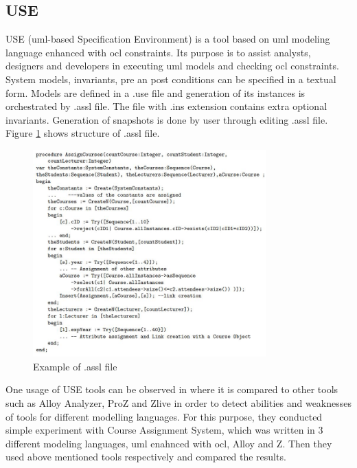 \subsection{USE}
\par
USE (\acrshort{uml}-based Specification Environment) \cite{USE_definition} is a tool based on \acrshort{uml} modeling language enhanced with \acrshort{ocl} constraints. Its purpose is to assist analysts, designers and developers in executing \acrshort{uml} models and checking \acrshort{ocl} constraints. System models, invariants,  pre an post conditions can be specified in a textual form. Models are defined in a .use file and generation of its instances is orchestrated by .assl file. The file with .ins extension contains extra optional invariants. Generation of snapshots is done by user through editing .assl file. Figure \ref{Fig:USE_test_generation} shows structure of .assl file.

\begin{figure} [htbp!]
	\centering
					\includegraphics[width=0.8\textwidth]{figures/USE_test_generation.JPG}
					\caption{\label{Fig:USE_test_generation} Example of .assl file \cite{USE_Alloy_Z_comparison}}
\end{figure}

\par
One usage of USE tools can be observed in \cite{USE_Alloy_Z_comparison} where it is compared to other tools such as Alloy Analyzer, ProZ and Zlive in order to detect abilities and weaknesses of tools for different modelling languages. For this purpose, they conducted simple experiment with Course Assignment System, which was written in 3 different modeling languages, \acrshort{uml} enahnced with \acrshort{ocl}, Alloy and Z. Then they used above mentioned tools respectively and compared the results.

